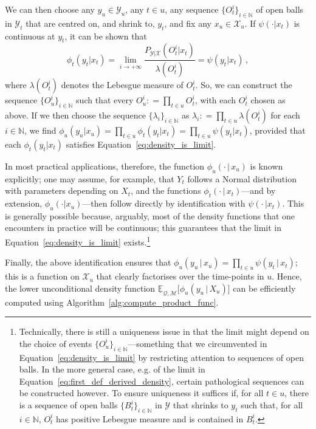 \documentclass[3p]{elsarticle}
\newcommand{\nats}{\mathbb{N}}
\newcommand{\states}{\mathcal{X}}
\newcommand{\observs}{\mathcal{Y}}
\newcommand{\rateset}{\mathcal{Q}}
\newcommand{\coloneqq}{:\!=}
\begin{document}
We can then choose any $y_u\in\observs_u$, any $t\in u$, any sequence $\{O_t^i\}_{i\in\nats}$ of open balls in $\observs_t$ that are centred on, and shrink to, $y_t$, and fix any $x_u\in\states_u$. If $\psi(\cdot\vert x_t)$ is continuous at $y_t$, it can be shown that
\begin{equation}\label{eq:density_is_limit}
\phi_t(y_t\vert x_t) = \lim_{i\to+\infty} \frac{P_{\observs\vert\states}(O_t^i\vert x_t)}{\lambda(O_t^i)} = \psi(y_t\vert x_t)\,,
\end{equation}
where $\lambda(O_t^i)$ denotes the Lebesgue measure of $O_t^i$. So, we can construct the sequence $\{O_u^i\}_{i\in\nats}$ such that every $O_u^i\coloneqq \prod_{t\in u}O_t^i$, with each $O_t^i$ chosen as above. If we then choose the sequence $\{\lambda_i\}_{i\in\nats}$ as $\lambda_i\coloneqq \prod_{t\in u}\lambda(O_t^i)$ for each $i\in\nats$, we find 
$\phi_u(y_u\vert x_u) = \prod_{t\in u}\phi_t(y_t\vert x_t)=\prod_{t\in u}\psi(y_t\vert x_t)$, 
provided that each $\phi_t(y_t\vert x_t)$ satisfies Equation~\eqref{eq:density_is_limit}. 

In most practical applications, therefore, the function $\phi_u(\cdot\,\vert\,x_u)$ is known explicitly; one may assume, for example, that $Y_t$ follows a Normal distribution with parameters depending on $X_t$, and the functions $\phi_t(\cdot\,\vert\,x_t)$---and by extension, $\phi_u(\cdot\vert x_u)$---then follow directly by identification with $\psi(\cdot\,\vert x_t)$. This is generally possible because, arguably, most of the density functions that one encounters in practice will be continuous; this guarantees that the limit in Equation~\eqref{eq:density_is_limit} exists.\footnote{Technically, there is still a uniqueness issue in that the limit might depend on the choice of events $\{O_u^i\}_{i\in\nats}$---something that we circumvented in Equation~\eqref{eq:density_is_limit} by restricting attention to sequences of open balls. In the more general case, e.g. of the limit in Equation~\eqref{eq:first_def_derived_density}, certain pathological sequences can be constructed however. To ensure uniqueness it suffices if, for all $t\in u$, there is a sequence of open balls $\{B_t^i\}_{i\in\nats}$ in $\observs$ that shrinks to $y_t$ such that, for all $i\in\nats$, $O_t^i$ has positive Lebesgue measure and is contained in $B_t^i$.\label{footnote:uniqueness}}

Finally, the above identification ensures that $\phi_u(y_u\,\vert\,x_u)=\prod_{t\in u}\psi(y_t\,\vert\,x_t)$; this is a function on $\states_u$ that clearly factorises over the time-points in $u$. Hence, the lower unconditional density function $\underline{\mathbb{E}}_{\rateset,\mathcal{M}}\bigl[\phi_u(y_u\,\vert\,X_u)\bigr]$ can be efficiently computed using Algorithm~\ref{alg:compute_product_func}.
\end{document}
